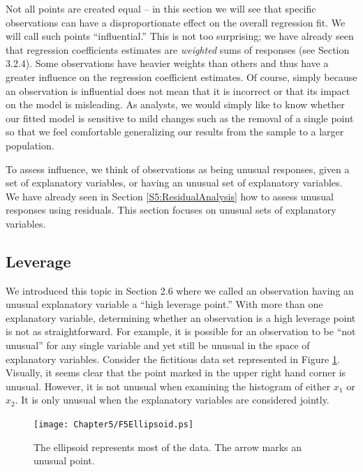 Not all points are created equal -- in this section we will see that
specific observations can have a disproportionate effect on the
overall regression fit. We will call such points ``influential.''
This is not too surprising; we have already seen that regression
coefficients estimates are \emph{weighted} sums of responses (see
Section 3.2.4). Some observations have heavier weights than others
and thus have a greater influence on the regression coefficient
estimates. Of course, simply because an observation is influential
does not mean that it is incorrect or that its impact on the model
is misleading. As analysts, we would simply like to know whether our
fitted model is sensitive to mild changes such as the removal of a
single point so that we feel comfortable generalizing our results
from the sample to a larger population.

To assess influence, we think of observations as being unusual
responses, given a set of explanatory variables, or having an
unusual set of explanatory variables. We have already seen in
Section \ref{S5:ResidualAnalysis} how to assess unusual responses
using residuals. This section focuses on unusual sets of explanatory
variables.


\subsection{Leverage}\label{S5:Leverage}

We introduced this topic in Section 2.6 where we called an
observation having an unusual explanatory variable a ``high leverage
point.'' With more than one explanatory variable, determining
whether an observation is a high leverage point is not as
straightforward. For example, it is possible for an observation to
be ``not unusual'' for any single variable and yet still be unusual
in the space of explanatory variables. Consider the fictitious data
set represented in Figure \ref{F5:Ellipsoid}. Visually, it seems
clear that the point marked in the upper right hand corner is
unusual. However, it is not unusual when examining the histogram of
either $x_1$ or $x_2$. It is only unusual when the explanatory
variables are considered jointly.



\begin{figure}[htp]
  \begin{center}
    \texttt{[image: Chapter5/F5Ellipsoid.ps]}
    \caption{\label{F5:Ellipsoid} \small  The ellipsoid
represents most of the data. The arrow marks an unusual point.}
  \end{center}
\end{figure}


